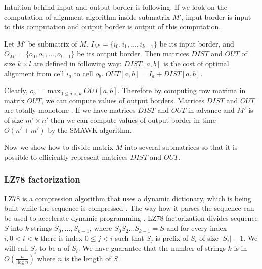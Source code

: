 Intuition behind input and output border is following. If we look on the
computation of alignment algorithm inside submatrix $M'$, input border is input
to this computation and output border is output of this computation.

\begin{definition}\cite{Crochemore2002}
Let $M'$ be submatrix of $M$, $I_{M'}=\{i_0,i_1,\dots,i_{k-1}\}$ be its input
border, and $O_{M'}=\{o_0,o_1,\dots,o_{l-1}\}$ be its output border. Then
matrices
$DIST$ and $OUT$ of size $k\times l$ are defined in following way:
$DIST[a,b]$ is the cost of optimal alignment from cell $i_a$ to cell $o_b$.
$OUT[a,b]=I_a+DIST[a,b]$.
\end{definition}

Clearly, $o_b=\max_{0\leq a < k}OUT[a,b]$. Therefore by computing row maxima in
matrix $OUT$, we can compute values of output borders. Matrices $DIST$ and $OUT$
are totally monotone \cite{Crochemore2002}.  If we have matrices $DIST$ and
$OUT$ in advance and $M'$ is of size $m'\times n'$ then we can compute values of
output border in time $O(n'+m')$ by the SMAWK algorithm.

Now we show how to divide matrix $M$ into several submatrices so that
it is possible to efficiently represent matrices $DIST$ and $OUT$.



\subsubsection{LZ78 factorization}

LZ78 is a compression algorithm that uses a dynamic dictionary, which is being built
while the sequence is compressed \cite{Lempel1976}. The way how it parses the sequence
can be used to accelerate dynamic programming \cite{Crochemore2002,Weimann2009}. 
LZ78 factorization divides
sequence $S$ into $k$ strings $S_0,\dots,S_{k-1}$, where $S_0S_2\dots S_{k-1}=S$ and
for every index  $i,0< i <k$ there is index $0\leq j<i$ such that $S_j$ is
prefix of $S_i$ of size $|S_i|-1$. We will call $S_j$ to be a
 of $S_i$.  We have guarantee that the number of strings
$k$ is in  $O(\frac{n}{\log n})$ where $n$ is the length of $S$
\cite{Lempel1976}. 

